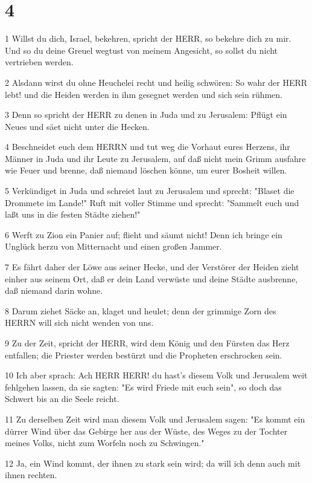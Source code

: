 \chapter{4}

\par 1 Willst du dich, Israel, bekehren, spricht der HERR, so bekehre dich zu mir. Und so du deine Greuel wegtust von meinem Angesicht, so sollst du nicht vertrieben werden.
\par 2 Alsdann wirst du ohne Heuchelei recht und heilig schwören: So wahr der HERR lebt! und die Heiden werden in ihm gesegnet werden und sich sein rühmen.
\par 3 Denn so spricht der HERR zu denen in Juda und zu Jerusalem: Pflügt ein Neues und säet nicht unter die Hecken.
\par 4 Beschneidet euch dem HERRN und tut weg die Vorhaut eures Herzens, ihr Männer in Juda und ihr Leute zu Jerusalem, auf daß nicht mein Grimm ausfahre wie Feuer und brenne, daß niemand löschen könne, um eurer Bosheit willen.
\par 5 Verkündiget in Juda und schreiet laut zu Jerusalem und sprecht: "Blaset die Drommete im Lande!" Ruft mit voller Stimme und sprecht: "Sammelt euch und laßt uns in die festen Städte ziehen!"
\par 6 Werft zu Zion ein Panier auf; flieht und säumt nicht! Denn ich bringe ein Unglück herzu von Mitternacht und einen großen Jammer.
\par 7 Es fährt daher der Löwe aus seiner Hecke, und der Verstörer der Heiden zieht einher aus seinem Ort, daß er dein Land verwüste und deine Städte ausbrenne, daß niemand darin wohne.
\par 8 Darum ziehet Säcke an, klaget und heulet; denn der grimmige Zorn des HERRN will sich nicht wenden von uns.
\par 9 Zu der Zeit, spricht der HERR, wird dem König und den Fürsten das Herz entfallen; die Priester werden bestürzt und die Propheten erschrocken sein.
\par 10 Ich aber sprach: Ach HERR HERR! du hast's diesem Volk und Jerusalem weit fehlgehen lassen, da sie sagten: "Es wird Friede mit euch sein", so doch das Schwert bis an die Seele reicht.
\par 11 Zu derselben Zeit wird man diesem Volk und Jerusalem sagen: "Es kommt ein dürrer Wind über das Gebirge her aus der Wüste, des Weges zu der Tochter meines Volks, nicht zum Worfeln noch zu Schwingen."
\par 12 Ja, ein Wind kommt, der ihnen zu stark sein wird; da will ich denn auch mit ihnen rechten.
